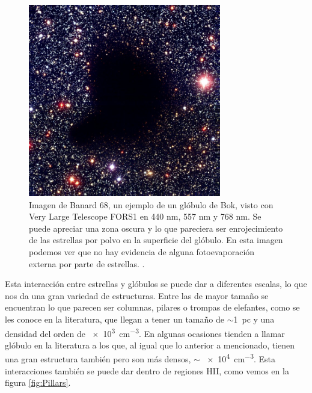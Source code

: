 \documentclass{book}
\begin{document}
\begin{figure}[h!]
    \centering
    \includegraphics[width=0.75\textwidth]{images Chapter 1/C1_Bok_globule.jpg}
    \caption{Imagen de Banard 68, un ejemplo de un glóbulo de Bok, visto con Very Large Telescope FORS1 en 440 nm, 557 nm y 768 nm. Se puede apreciar una zona oscura y lo que pareciera ser enrojecimiento de las estrellas por polvo en la superficie del glóbulo. En esta imagen podemos ver que no hay evidencia de alguna fotoevaporación externa por parte de estrellas. \citep{Alves:2001}.}
    \label{fig:Banard}
\end{figure}

Esta interacción entre estrellas y glóbulos se puede dar a diferentes escalas, lo que nos da una gran variedad de estructuras. Entre las de mayor tamaño se encuentran lo que parecen ser columnas, pilares o trompas de elefantes, como se les conoce en la literatura, que llegan a tener un tamaño de $\sim$\SI{1}{pc} y una densidad del orden de \SI{e3}{cm^{-3}}. En algunas ocasiones tienden a llamar glóbulo en la literatura a los que, al igual que lo anterior a mencionado, tienen una gran estructura también pero son más densos, $\sim$ \SI{e4}{cm^{-3}}. Esta interacciones también se puede dar dentro de regiones HII, como vemos en la figura \ref{fig:Pillars}.
\end{document}
